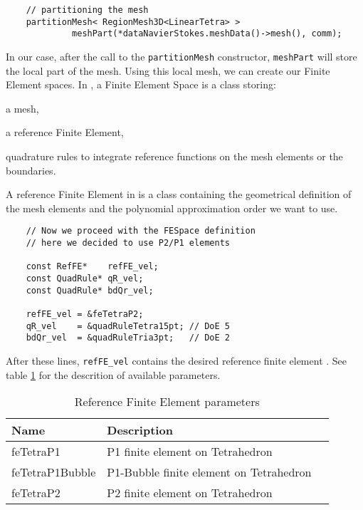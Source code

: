 \begin{verbatim}
    // partitioning the mesh
    partitionMesh< RegionMesh3D<LinearTetra> >
             meshPart(*dataNavierStokes.meshData()->mesh(), comm);
\end{verbatim}

In our case, after the call to the \verb!partitionMesh! constructor, \verb!meshPart! will store
the local part of the mesh. Using this local mesh, 
we can create our Finite Element  spaces.
In \lifev, a Finite Element Space is a class storing:
\begin{description}
\item a mesh,
\item a reference Finite Element,
\item quadrature rules to integrate reference functions on the mesh elements or the boundaries.
\end{description}

A reference Finite Element in \lifev is a class containing the geometrical definition
of the mesh elements and the polynomial approximation order we want to use.

\begin{verbatim}
    // Now we proceed with the FESpace definition
    // here we decided to use P2/P1 elements

    const RefFE*    refFE_vel;
    const QuadRule* qR_vel;
    const QuadRule* bdQr_vel;

    refFE_vel = &feTetraP2;
    qR_vel    = &quadRuleTetra15pt; // DoE 5
    bdQr_vel  = &quadRuleTria3pt;   // DoE 2

\end{verbatim}

After these lines, \verb!refFE_vel! contains the desired reference finite element  
. See table \ref{table-feapproxorder}
for the descrition of available parameters.

\begin{table}
\begin{center}
\begin{tabular}{|l|l|l|}
\hline
Name  & Description \\
\hline \hline
feTetraP1 & P1 finite element on Tetrahedron \\
feTetraP1Bubble & P1-Bubble finite element on Tetrahedron \\
feTetraP2 & P2 finite element on Tetrahedron \\
\hline
\end{tabular}
\end{center}
\caption{ Reference Finite Element parameters}
\label{table-feapproxorder}
\end{table}

